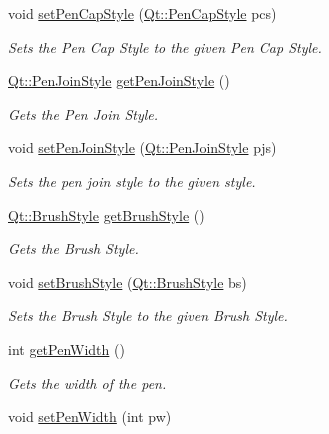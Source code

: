 \begin{DoxyCompactItemize}
void \hyperlink{classSquare_a5b9e32153640bdb937b1140f1c45083e}{set\+Pen\+Cap\+Style} (\hyperlink{shape__input__file__specs_8txt_a622efdcfef6789d4367974d2fe79019e}{Qt\+::\+Pen\+Cap\+Style} pcs)
\begin{DoxyCompactList}\small\item\em Sets the Pen Cap Style to the given Pen Cap Style. \end{DoxyCompactList}\item 
\hyperlink{shape__input__file__specs_8txt_a007db2043c6063881de2043c05c9c4a9}{Qt\+::\+Pen\+Join\+Style} \hyperlink{classSquare_a6fd69d97012e009ffea95e457f3a845e}{get\+Pen\+Join\+Style} ()
\begin{DoxyCompactList}\small\item\em Gets the Pen Join Style. \end{DoxyCompactList}\item 
void \hyperlink{classSquare_a51ebefc5fc56435612188060b6088bd7}{set\+Pen\+Join\+Style} (\hyperlink{shape__input__file__specs_8txt_a007db2043c6063881de2043c05c9c4a9}{Qt\+::\+Pen\+Join\+Style} pjs)
\begin{DoxyCompactList}\small\item\em Sets the pen join style to the given style. \end{DoxyCompactList}\item 
\hyperlink{shape__input__file__specs_8txt_ad07f6fe6c28dcb0b3bdc324a72d0051f}{Qt\+::\+Brush\+Style} \hyperlink{classSquare_a63e121e72afaba2766f24a0d8816974f}{get\+Brush\+Style} ()
\begin{DoxyCompactList}\small\item\em Gets the Brush Style. \end{DoxyCompactList}\item 
void \hyperlink{classSquare_aec04ffe7d0b567be4a7221013add1d6d}{set\+Brush\+Style} (\hyperlink{shape__input__file__specs_8txt_ad07f6fe6c28dcb0b3bdc324a72d0051f}{Qt\+::\+Brush\+Style} bs)
\begin{DoxyCompactList}\small\item\em Sets the Brush Style to the given Brush Style. \end{DoxyCompactList}\item 
int \hyperlink{classSquare_ac6b3bedb6d43e5059840221331d802fd}{get\+Pen\+Width} ()
\begin{DoxyCompactList}\small\item\em Gets the width of the pen. \end{DoxyCompactList}\item 
void \hyperlink{classSquare_a26697e2c607e6cbda21a63e0f292e5e6}{set\+Pen\+Width} (int pw)

\end{DoxyCompactItemize}
